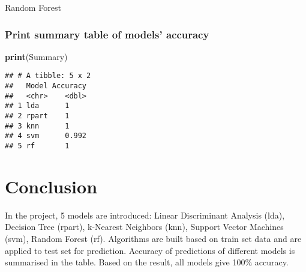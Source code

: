 \documentclass[]{article}
\newenvironment{Shaded}{\begin{snugshade}}{\end{snugshade}}
\newcommand{\KeywordTok}[1]{\textcolor[rgb]{0.13,0.29,0.53}{\textbf{#1}}}
\newcommand{\DataTypeTok}[1]{\textcolor[rgb]{0.13,0.29,0.53}{#1}}
\newcommand{\StringTok}[1]{\textcolor[rgb]{0.31,0.60,0.02}{#1}}
\newcommand{\OperatorTok}[1]{\textcolor[rgb]{0.81,0.36,0.00}{\textbf{#1}}}
\newcommand{\NormalTok}[1]{#1}
\begin{document}
Random Forest

\begin{Shaded}
\end{Shaded}

\subsubsection{Print summary table of models'
accuracy}\label{print-summary-table-of-models-accuracy}

\begin{Shaded}
\begin{Highlighting}[]
\KeywordTok{print}\NormalTok{(Summary)}
\end{Highlighting}
\end{Shaded}

\begin{verbatim}
## # A tibble: 5 x 2
##   Model Accuracy
##   <chr>    <dbl>
## 1 lda      1    
## 2 rpart    1    
## 3 knn      1    
## 4 svm      0.992
## 5 rf       1
\end{verbatim}

\section{Conclusion}\label{conclusion}

In the project, 5 models are introduced: Linear Discriminant Analysis
(lda), Decision Tree (rpart), k-Nearest Neighbors (knn), Support Vector
Machines (svm), Random Forest (rf). Algorithms are built based on train
set data and are applied to test set for prediction. Accuracy of
predictions of different models is summarised in the table. Based on the
result, all models give 100\% accuracy.
\end{document}
